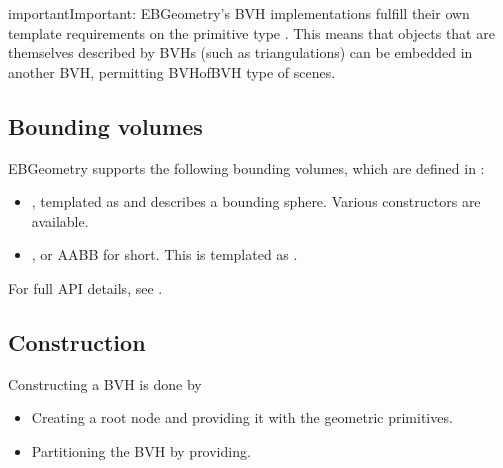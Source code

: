 \documentclass[letterpaper,10pt,english]{sphinxmanual}
\begin{document}
\begin{sphinxadmonition}{important}{Important:}
\sphinxAtStartPar
EBGeometry’s BVH implementations fulfill their own template requirements on the primitive type .
This means that objects that are themselves described by BVHs (such as triangulations) can be embedded in another BVH, permitting BVH\sphinxhyphen{}of\sphinxhyphen{}BVH type of scenes.
\end{sphinxadmonition}


\subsection{Bounding volumes}
\label{\detokenize{ImplemBVH:bounding-volumes}}
\sphinxAtStartPar
EBGeometry supports the following bounding volumes, which are defined in :
\begin{itemize}
\item {} 
\sphinxAtStartPar
{}, templated as  and describes a bounding sphere.
Various constructors are available.

\item {} 
\sphinxAtStartPar
{}, or AABB for short.
This is templated as .

\end{itemize}

\sphinxAtStartPar
For full API details, see .


\subsection{Construction}
\label{\detokenize{ImplemBVH:construction}}\label{\detokenize{ImplemBVH:chap-bvhconstruction}}
\sphinxAtStartPar
Constructing a BVH is done by
\begin{itemize}
\item {} 
\sphinxAtStartPar
Creating a root node and providing it with the geometric primitives.

\item {} 
\sphinxAtStartPar
Partitioning the BVH by providing.

\end{itemize}
\end{document}
